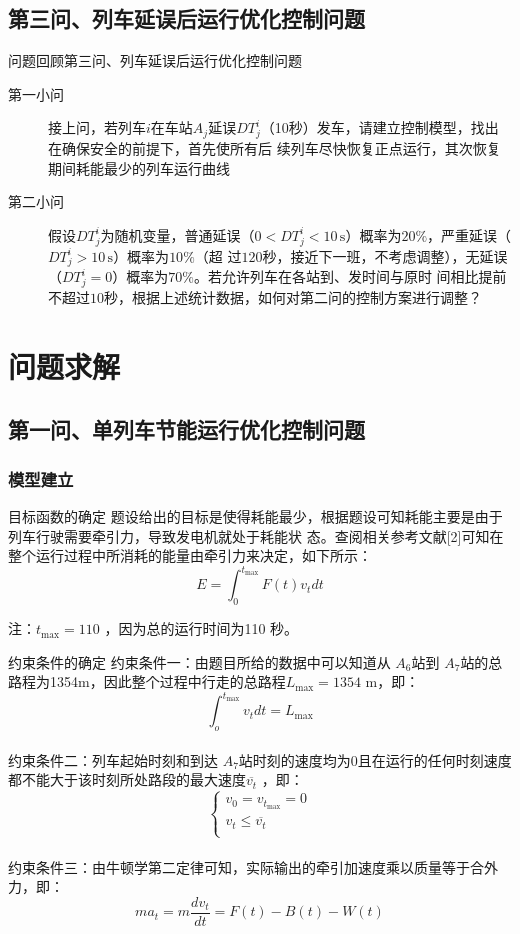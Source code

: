 \documentclass{beamer}
\begin{document}
\subsection{第三问、列车延误后运行优化控制问题}
\begin{frame}{问题回顾}{第三问、列车延误后运行优化控制问题}
\begin{description}
  \item[第一小问] 接上问，若列车$i$在车站$A_j$延误$DT_j^i$（10秒）发车，请建立控制模型，找出在确保安全的前提下，首先使所有后
续列车尽快恢复正点运行，其次恢复期间耗能最少的列车运行曲线
  \item[第二小问] 假设$DT_j^i$为随机变量，普通延误（$0<DT_j^i <10 \, \mathrm{s}$）概率为$20\%$，严重延误（$DT_j^i >10 \, \mathrm{s}$）概率为$10\%$（超
过$120$秒，接近下一班，不考虑调整），无延误（$DT_j^i= 0$）概率为$70\%$。若允许列车在各站到、发时间与原时
间相比提前不超过$10$秒，根据上述统计数据，如何对第二问的控制方案进行调整？
\end{description}
\end{frame}

\section{问题求解}
\subsection{第一问、单列车节能运行优化控制问题}
\subsubsection{模型建立}
\begin{frame}{目标函数的确定}
题设给出的目标是使得耗能最少，根据题设可知耗能主要是由于列车行驶需要牵引力，导致发电机就处于耗能状
态。查阅相关参考文献[2]可知在整个运行过程中所消耗的能量由牵引力来决定，如下所示：
\[E = \int_0^{{t_{\max }}} {F\left( t \right){v_t}dt} \]

注：${t_{\max }} = 110$ ，因为总的运行时间为110 秒。
\end{frame}

\begin{frame}{约束条件的确定}
约束条件一：由题目所给的数据中可以知道从 $A_6$站到 $A_7$站的总路程为1354m，因此整个过程中行走的总路程${L_{\max }} = 1354$ m，即：
\[\int_o^{{t_{\max }}} {{v_t}dt}  = {L_{\max }}\]
\\
约束条件二：列车起始时刻和到达 $A_7$站时刻的速度均为0且在运行的任何时刻速度都不能大于该时刻所处路段的最大速度$\overline {{v_t}} $ ，即：
\[\left\{ \begin{array}{l}
 {v_0} = {v_{{t_{\max }}}} = 0 \\
 {v_t} \le \overline {{v_t}}  \\
 \end{array} \right.\]
\\
约束条件三：由牛顿学第二定律可知，实际输出的牵引加速度乘以质量等于合外力，即：
\[m{a_t} = m\frac{{d{v_t}}}{{dt}} = F\left( t \right) - B\left( t \right) - W\left( t \right)\]
\end{frame}
\end{document}
